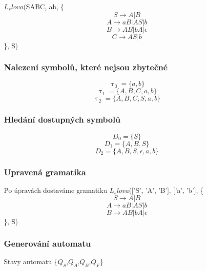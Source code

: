 $L_slova$(SABC, ab, \{
$$S \rightarrow A|B$$$$A \rightarrow aB|AS|b$$$$B \rightarrow AB|bA|\epsilon$$$$C \rightarrow AS|b$$\},
S)

\subsubsection{Nalezení symbolů, které nejsou zbytečné}$$\uptau_0 = \{a,b\}$$$$\uptau_1 = \{A,B,C,a,b\}$$$$\uptau_2 = \{A,B,C,S,a,b\}$$\subsubsection{Hledání dostupných symbolů}$$D_0 = \{S\}$$$$D_1 = \{A,B,S\}$$$$D_2 = \{A,B,S,\epsilon,a,b\}$$\subsubsection{Upravená gramatika}
Po úpravách dostaváme gramatiku
$L_slova$(['S', 'A', 'B'], ['a', 'b'], \{
$$S \rightarrow A|B$$$$A \rightarrow aB|AS|b$$$$B \rightarrow AB|bA|\epsilon$$\},
S)

\subsubsection{Generování automatu}
Stavy automatu \{$Q_{S}$,$Q_{A}$,$Q_{B}$,$Q_{F}$\}
